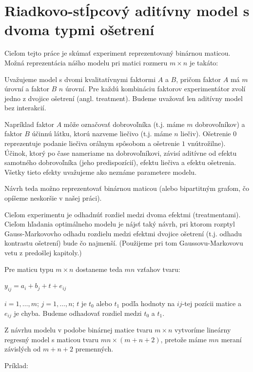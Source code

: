 \section{Riadkovo-stĺpcový aditívny model s dvoma typmi ošetrení}
\label{my model}

Cieľom tejto práce je skúmať experiment reprezentovaný binárnou maticou.
Možná reprezentácia nášho modelu pri matici rozmeru $m \times n$ je takáto:

Uvažujeme model s dvomi kvalitatívnymi faktormi $A$ a $B$, 
pričom faktor $A$ má $m$ úrovní a faktor $B$ $n$ úrovní. 
Pre každú kombináciu faktorov experimentátor zvolí jedno z dvojice ošetrení (angl. treatment).
Budeme uvažovať len aditívny model bez interakcií.

Napríklad faktor $A$ môže označovať dobrovoľníka (t.j. máme $m$ dobrovoľníkov) 
a faktor $B$ účinnú látku, ktorú nazveme liečivo (t.j. máme $n$ liečiv). 
Ošetrenie $0$ reprezentuje podanie liečiva orálnym spôsobom a ošetrenie $1$ vnútrožilne).
Účinok, ktorý po čase nameriame na dobrovoľníkovi, 
závisí aditívne od efektu samotného dobrovoľníka (jeho predispozícií), 
efektu liečiva a efektu ošetrenia. 
Všetky tieto efekty uvažujeme ako neznáme parametere modelu.

Návrh teda možno reprezentovať binárnou maticou 
(alebo bipartitným grafom, čo opíšeme neskoršie v našej práci).

Cieľom experimentu je odhadnúť rozdiel medzi dvoma efektmi (treatmentami).
Cieľom hľadania optimálneho modelu je nájsť taký návrh, pri ktorom
rozptyl Gauss-Markovovho odhadu rozdielu medzi efektmi dvojice ošetrení (t.j. odhadu kontrastu ošetrení) bude čo najmenší.
(Použijeme pri tom Gaussovu-Markovovu vetu z predošlej kapitoly.)

Pre maticu typu $m \times n$ dostaneme teda $mn$ vzťahov tvaru:

\begin{center}
$
y_{ij} = a_i + b_j + t + e_{ij}
$
\end{center}

$i = 1, \ldots, m$; $j = 1, \ldots, n$; $t$ je $t_0$ alebo $t_1$ podľa hodnoty na $ij$-tej pozícii matice a $e_{ij}$ je chyba.
Budeme odhadovať rozdiel medzi $t_0$ a $t_1$.

Z návrhu modelu v podobe binárnej matice tvaru $m \times n$ vytvoríme lineárny regresný model
s maticou tvaru $mn \times (m + n + 2)$, pretože máme $mn$ meraní závislých od $m + n + 2$ premenných.

Príklad:

